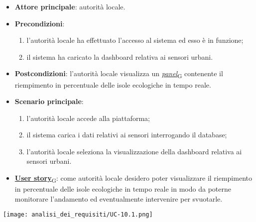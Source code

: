 \begin{itemize}
	\item \textbf{Attore principale}: autorità locale.
	\item \textbf{Precondizioni}:
	      \begin{enumerate}
		      \item l'autorità locale ha effettuato l'accesso al sistema ed esso è in funzione;
		      \item il sistema ha caricato la dashboard relativa ai sensori urbani.
	      \end{enumerate}
	\item \textbf{Postcondizioni}: l'autorità locale visualizza un \href{https://7last.github.io/docs/pb/documentazione-interna/glossario\#panel}{\textit{panel}\textsubscript{G}} contenente il riempimento in percentuale delle isole ecologiche in tempo reale.
	\item \textbf{Scenario principale}:
	      \begin{enumerate}
		      \item l'autorità locale accede alla piattaforma;
		      \item il sistema carica i dati relativi ai sensori interrogando il database;
		      \item l'autorità locale seleziona la visualizzazione della dashboard relativa ai sensori urbani.
	      \end{enumerate}
	\item \href{https://7last.github.io/docs/pb/documentazione-interna/glossario\#user-story}{\textbf{User story}\textsubscript{G}}:
	      come autorità locale desidero poter visualizzare il riempimento in percentuale delle isole ecologiche in tempo reale in modo da poterne monitorare l'andamento
	      ed eventualmente intervenire per svuotarle.
\end{itemize}
\begin{center}
	\texttt{[image: analisi\_dei\_requisiti/UC-10.1.png]}
\end{center}


